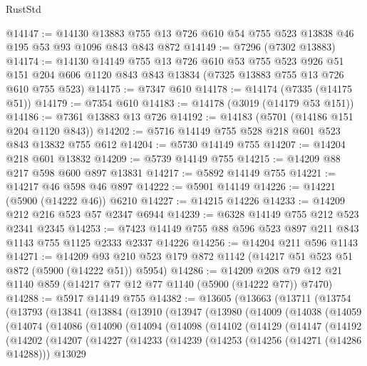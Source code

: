 \begin{lexlean}{RustStd}
\begin{coremodule}
@14147 := @14130
    @13883
    @755
    @13
    @726
    @610
    @54
    @755
    @523
    @13838
    @46
    @195
    @53
    @93
    @1096
    @843
    @843
    @872
@14149 := @7296 (@7302 @13883)
@14174 := @14130
    @14149
    @755
    @13
    @726
    @610
    @53
    @755
    @523
    @926
    @51
    @151
    @204
    @606
    @1120
    @843
    @843
    @13834
    (@7325 @13883 @755 @13 @726 @610 @755 @523)
@14175 := @7347 @610
@14178 := @14174 (@7335 (@14175 @51))
@14179 := @7354 @610
@14183 := @14178 (@3019 (@14179 @53 @151))
@14186 := @7361 @13883 @13 @726
@14192 := @14183 (@5701 (@14186 @151 @204 @1120 @843))
@14202 := @5716 @14149 @755 @528 @218 @601 @523 @843 @13832 @755 @612
@14204 := @5730 @14149 @755
@14207 := @14204 @218 @601 @13832
@14209 := @5739 @14149 @755
@14215 := @14209 @88 @217 @598 @600 @897 @13831
@14217 := @5892 @14149 @755
@14221 := @14217 @46 @598 @46 @897
@14222 := @5901 @14149
@14226 := @14221 (@5900 (@14222 @46)) @6210
@14227 := @14215 @14226
@14233 := @14209 @212 @216 @523 @57 @2347 @6944
@14239 := @6328 @14149 @755 @212 @523 @2341 @2345
@14253 := @7423 @14149 @755 @88 @596 @523 @897 @211 @843 @1143 @755 @1125 @2333 @2337 @14226
@14256 := @14204 @211 @596 @1143
@14271 := @14209 @93 @210 @523 @179 @872 @1142 (@14217 @51 @523 @51 @872 (@5900 (@14222 @51)) @5954)
@14286 := @14209 @208 @79 @12 @21 @1140 @859 (@14217 @77 @12 @77 @1140 (@5900 (@14222 @77)) @7470)
@14288 := @5917 @14149 @755
@14382 := @13605
    (@13663
      (@13711
        (@13754
          (@13793
            (@13841
              (@13884
                (@13910
                  (@13947
                    (@13980
                      (@14009
                        (@14038
                          (@14059
                            (@14074
                              (@14086
                                (@14090
                                  (@14094
                                    (@14098
                                      (@14102
                                        (@14129
                                          (@14147
                                            (@14192
                                              (@14202
                                                (@14207
                                                  (@14227
                                                    (@14233
                                                      (@14239
                                                        (@14253
                                                          (@14256 (@14271 (@14286 @14288)))
                                                          @13029

\end{coremodule}
\end{lexlean}
